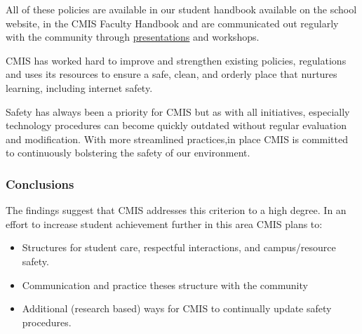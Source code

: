 \begin{findings}
All of these policies are available in our student handbook available on the school website, in the CMIS Faculty Handbook and are communicated out regularly with the community through \href{https://docs.google.com/a/cmis.ac.th/presentation/d/1QRUmBmMM63pQlvP0Qemq272VPojLj5sZv3GuweO9J-Q/edit?usp=sharing}{presentations} and workshops.


CMIS has worked hard to improve and strengthen existing policies, regulations and uses its resources to ensure a safe, clean, and orderly place that nurtures learning, including internet safety. 

Safety has always been a priority for CMIS but as with all initiatives, especially technology  procedures can become quickly outdated without regular evaluation and modification. With more streamlined practices,in place CMIS is committed to continuously bolstering the safety of our environment. 
\end{findings}

\subsubsection{Conclusions}
The findings suggest that CMIS addresses this criterion to a high degree. In an effort to increase student achievement further in this area CMIS plans to:

\begin{itemize}
\item Structures for student care, respectful interactions, and campus/resource safety.
\item Communication and practice theses structure with the community
\end{itemize}
\begin{itemize}
\item Additional (research based) ways for CMIS to continually update safety procedures.
\end{itemize}
